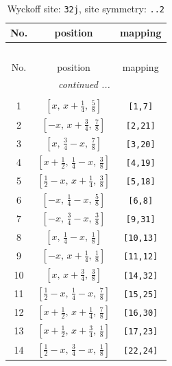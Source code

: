 \documentclass[fleqn,8pt]{jsarticle}
\begin{document}
\begin{longtable}{ccc}
\caption{Wyckoff site: {\tt 32j}, site symmetry: {\tt ..2}}
 \\
 \hline \hline
No. & position & mapping \\ \hline \endfirsthead

\multicolumn{2}{l}{\tablename\ \thetable{}} \\
 \hline \hline
No. & position & mapping \\ \hline \endhead

 \hline \hline
\multicolumn{2}{r}{\footnotesize\it continued ...} \\ \endfoot

 \hline \hline
\multicolumn{2}{r}{} \\ \endlastfoot

1 & $\left[ x,\, x + \frac{1}{4},\, \frac{5}{8} \right]$ & {\tt [1,7]} \\ \hline
2 & $\left[ - x,\, x + \frac{3}{4},\, \frac{7}{8} \right]$ & {\tt [2,21]} \\ \hline
3 & $\left[ x,\, \frac{3}{4} - x,\, \frac{7}{8} \right]$ & {\tt [3,20]} \\ \hline
4 & $\left[ x + \frac{1}{2},\, \frac{1}{4} - x,\, \frac{3}{8} \right]$ & {\tt [4,19]} \\ \hline
5 & $\left[ \frac{1}{2} - x,\, x + \frac{1}{4},\, \frac{3}{8} \right]$ & {\tt [5,18]} \\ \hline
6 & $\left[ - x,\, \frac{1}{4} - x,\, \frac{5}{8} \right]$ & {\tt [6,8]} \\ \hline
7 & $\left[ - x,\, \frac{3}{4} - x,\, \frac{3}{8} \right]$ & {\tt [9,31]} \\ \hline
8 & $\left[ x,\, \frac{1}{4} - x,\, \frac{1}{8} \right]$ & {\tt [10,13]} \\ \hline
9 & $\left[ - x,\, x + \frac{1}{4},\, \frac{1}{8} \right]$ & {\tt [11,12]} \\ \hline
10 & $\left[ x,\, x + \frac{3}{4},\, \frac{3}{8} \right]$ & {\tt [14,32]} \\ \hline
11 & $\left[ \frac{1}{2} - x,\, \frac{1}{4} - x,\, \frac{7}{8} \right]$ & {\tt [15,25]} \\ \hline
12 & $\left[ x + \frac{1}{2},\, x + \frac{1}{4},\, \frac{7}{8} \right]$ & {\tt [16,30]} \\ \hline
13 & $\left[ x + \frac{1}{2},\, x + \frac{3}{4},\, \frac{1}{8} \right]$ & {\tt [17,23]} \\ \hline
14 & $\left[ \frac{1}{2} - x,\, \frac{3}{4} - x,\, \frac{1}{8} \right]$ & {\tt [22,24]} \\ \hline

\end{longtable}
\end{document}
